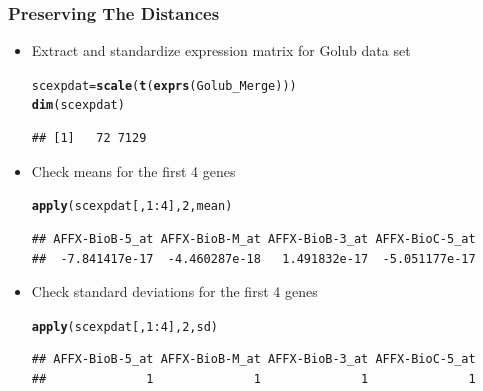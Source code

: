 \documentclass[xcolor=x11names,compress]{beamer}\usepackage[]{graphicx}\usepackage[]{color}
\makeatletter
\newcommand{\hlnum}[1]{\textcolor[rgb]{0.686,0.059,0.569}{#1}}%
\newcommand{\hlopt}[1]{\textcolor[rgb]{0,0,0}{#1}}%
\newcommand{\hlstd}[1]{\textcolor[rgb]{0.345,0.345,0.345}{#1}}%
\newcommand{\hlkwb}[1]{\textcolor[rgb]{0.69,0.353,0.396}{#1}}%
\newcommand{\hlkwd}[1]{\textcolor[rgb]{0.737,0.353,0.396}{\textbf{#1}}}%
\newenvironment{kframe}{%
 \def\at@end@of@kframe{}%
 \ifinner\ifhmode%
  \def\at@end@of@kframe{\end{minipage}}%
  \begin{minipage}{\columnwidth}%
 \fi\fi%
 \def\FrameCommand##1{\hskip\@totalleftmargin \hskip-\fboxsep
 \colorbox{shadecolor}{##1}\hskip-\fboxsep
     \hskip-\linewidth \hskip-\@totalleftmargin \hskip\columnwidth}%
 \MakeFramed {\advance\hsize-\width
   \@totalleftmargin\z@ \linewidth\hsize
   \@setminipage}}%
 {\par\unskip\endMakeFramed%
 \at@end@of@kframe}
\newenvironment{knitrout}{}{} %
\makeatother
\begin{document}
\begin{frame}[containsverbatim]
  \frametitle{Preserving The Distances}
\footnotesize
  \begin{itemize}
\item Extract and standardize expression matrix for Golub data set
\begin{knitrout}\tiny
{}\color{fgcolor}\begin{kframe}
\begin{alltt}
\hlstd{scexpdat}\hlkwb{=}\hlkwd{scale}\hlstd{(}\hlkwd{t}\hlstd{(}\hlkwd{exprs}\hlstd{(Golub_Merge)))}
\hlkwd{dim}\hlstd{(scexpdat)}
\end{alltt}
\begin{verbatim}
## [1]   72 7129
\end{verbatim}
\end{kframe}
\end{knitrout}
\item Check means for the first 4 genes
\begin{knitrout}\tiny
{}\color{fgcolor}\begin{kframe}
\begin{alltt}
\hlkwd{apply}\hlstd{(scexpdat[,}\hlnum{1}\hlopt{:}\hlnum{4}\hlstd{],}\hlnum{2}\hlstd{,mean)}
\end{alltt}
\begin{verbatim}
## AFFX-BioB-5_at AFFX-BioB-M_at AFFX-BioB-3_at AFFX-BioC-5_at 
##  -7.841417e-17  -4.460287e-18   1.491832e-17  -5.051177e-17
\end{verbatim}
\end{kframe}
\end{knitrout}
\item Check standard deviations for the first 4 genes
\begin{knitrout}\tiny
{}\color{fgcolor}\begin{kframe}
\begin{alltt}
\hlkwd{apply}\hlstd{(scexpdat[,}\hlnum{1}\hlopt{:}\hlnum{4}\hlstd{],}\hlnum{2}\hlstd{,sd)}
\end{alltt}
\begin{verbatim}
## AFFX-BioB-5_at AFFX-BioB-M_at AFFX-BioB-3_at AFFX-BioC-5_at 
##              1              1              1              1
\end{verbatim}
\end{kframe}
\end{knitrout}
\end{itemize}
\end{frame}
\end{document}
